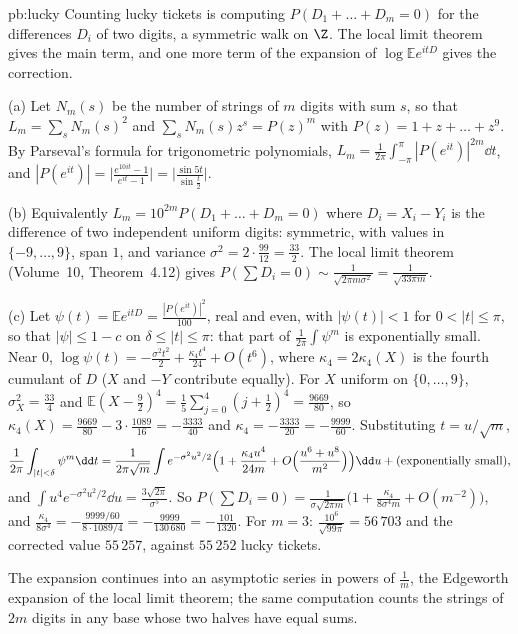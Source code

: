 \begin{solution}{pb:lucky}
\idea Counting lucky tickets is computing $P(D_1+\dots+D_m=0)$ for the differences $D_i$ of two digits, a symmetric walk on $\Z$. The local limit theorem gives the main
term, and one more term of the expansion of $\log\mathbb Ee^{itD}$ gives the correction.

\writeup (a) Let $N_m(s)$ be the number of strings of $m$ digits with sum $s$, so that $L_m=\sum_sN_m(s)^2$ and $\sum_sN_m(s)z^s=P(z)^m$ with $P(z)=1+z+\dots+z^9$. By
Parseval's formula for trigonometric polynomials, $L_m=\frac1{2\pi}\int_{-\pi}^\pi|P(e^{it})|^{2m}\dd t$, and $|P(e^{it})|=\bigl|\frac{e^{10it}-1}{e^{it}-1}\bigr|=\bigl|\frac{\sin5t}{\sin\frac t2}\bigr|$.

(b) Equivalently $L_m=10^{2m}P(D_1+\dots+D_m=0)$ where $D_i=X_i-Y_i$ is the difference of two independent uniform digits: symmetric, with values in $\{-9,\dots,9\}$,
span $1$, and variance $\sigma^2=2\cdot\frac{99}{12}=\frac{33}2$. The local limit theorem (Volume~10, Theorem~4.12) gives
$P(\sum D_i=0)\sim\frac1{\sqrt{2\pi m\sigma^2}}=\frac1{\sqrt{33\pi m}}$.

(c) Let $\psi(t)=\mathbb Ee^{itD}=\frac{|P(e^{it})|^2}{100}$, real and even, with $|\psi(t)|<1$ for $0<|t|\le\pi$, so that $|\psi|\le1-c$ on $\delta\le|t|\le\pi$: that part of
$\frac1{2\pi}\int\psi^m$ is exponentially small. Near $0$, $\log\psi(t)=-\frac{\sigma^2t^2}2+\frac{\kappa_4t^4}{24}+O(t^6)$, where $\kappa_4=2\kappa_4(X)$ is the fourth cumulant
of $D$ ($X$ and $-Y$ contribute equally). For $X$ uniform on $\{0,\dots,9\}$, $\sigma_X^2=\frac{33}4$ and $\mathbb E(X-\frac92)^4=\frac15\sum_{j=0}^4(j+\frac12)^4=\frac{9669}{80}$, so
$\kappa_4(X)=\frac{9669}{80}-3\cdot\frac{1089}{16}=-\frac{3333}{40}$ and $\kappa_4=-\frac{3333}{20}=-\frac{9999}{60}$. Substituting
$t=u/\sqrt m$,
\[
\frac1{2\pi}\int_{|t|<\delta}\psi^m\dd t=\frac1{2\pi\sqrt m}\int e^{-\sigma^2u^2/2}\Bigl(1+\frac{\kappa_4u^4}{24m}+O\Bigl(\frac{u^6+u^8}{m^2}\Bigr)\Bigr)\dd u+(\text{exponentially small}),
\]
and $\int u^4e^{-\sigma^2u^2/2}\dd u=\frac{3\sqrt{2\pi}}{\sigma^5}$. So $P(\sum D_i=0)=\frac1{\sigma\sqrt{2\pi m}}\bigl(1+\frac{\kappa_4}{8\sigma^4m}+O(m^{-2})\bigr)$, and
$\frac{\kappa_4}{8\sigma^4}=-\frac{9999/60}{8\cdot1089/4}=-\frac{9999}{130\,680}=-\frac{101}{1320}$. For $m=3$: $\frac{10^6}{\sqrt{99\pi}}=56\,703$ and the corrected value $55\,257$,
against $55\,252$ lucky tickets.

\leads The expansion continues into an asymptotic series in powers of $\frac1m$, the Edgeworth expansion of the local limit theorem; the same
computation counts the strings of $2m$ digits in any base whose two halves have equal sums.
\end{solution}

